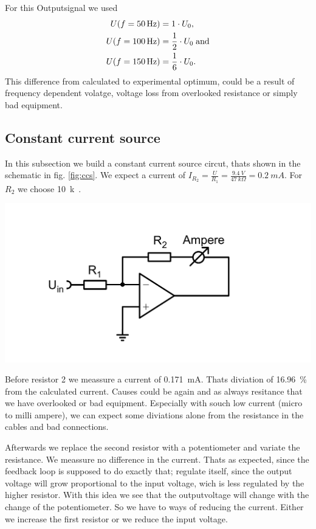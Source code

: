\documentclass[a4paper,10pt]{article}
\newenvironment{Figure}
        {\par\medskip\noindent\minipage{\linewidth}}
        {\endminipage\par\medskip}
\numberwithin{equation}{section}
\begin{document}
\begin{multicols}{2}
\begin{Figure}
		\label{fig:foundsaw}
	\end{Figure}
	For this Outputsignal we used
	\begin{align*}
		U(f=\SI{50}{Hz})  & =1\cdot U_0\text{,}               \\
		U(f=\SI{100}{Hz}) & =\frac{1}{2}\cdot U_0\text{\;and} \\
		U(f=\SI{150}{Hz}) & =\frac{1}{6}\cdot U_0\text{.}
	\end{align*}
	This difference from calculated to experimental optimum, could be a result of frequency dependent volatge, voltage loss from overlooked resistance or simply bad equipment.
	\subsection{Constant current source}
	In this subsection we build a constant current source circut, thats shown in the schematic in fig. \ref{fig:ccs}. We expect a current of $I_{R_2}=\frac{U}{R_1}=\frac{\SI{9.4}{V}}{\SI{47}{k\Omega}}=\SI{0.2}{mA}$. For $R_2$ we choose \SI{10}{k\Omega}.
	\begin{Figure}
		\centering
		\includegraphics[width=1\textwidth]{conscurrentshematic.png}
		\label{fig:ccs}
	\end{Figure}
	Before resistor 2 we meassure a current of \SI{0.171}{\milli A}. Thats diviation of \SI{16.96}{\%} from the calculated current. Causes could be again and as always resitance that we have overlooked or bad equipment. Especially with souch low current (micro to milli ampere), we can expect some diviations alone from the resistance in the cables and bad connections.

	Afterwards we replace the second resistor with a potentiometer and variate the resistance. We meassure no difference in the current. Thats as expected, since the feedback loop is supposed to do exactly that; regulate itself, since the output voltage will grow proportional to the input voltage, wich is less regulated by the higher resistor. With this idea we see that the outputvoltage will change with the change of the potentiometer. So we have to ways of reducing the current. Either we increase the first resistor or we reduce the input voltage.


\end{multicols}
\end{document}
